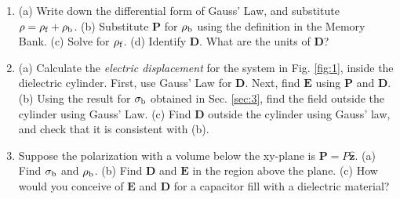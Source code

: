 \documentclass[10pt]{article}
\begin{document}
\begin{enumerate}
\item (a) Write down the differential form of Gauss' Law, and substitute $\rho = \rho_{\rm f} + \rho_{\rm b}$. (b) Substitute $\mathbf{P}$ for $\rho_{\rm b}$ using the definition in the Memory Bank. (c) Solve for $\rho_{\rm f}$. (d) Identify $\mathbf{D}$. What are the units of $\mathbf{D}$? \\ \vspace{1cm}
\item (a) Calculate the \textit{electric displacement} for the system in Fig. \ref{fig:1}, inside the dielectric cylinder.  First, use Gauss' Law for $\mathbf{D}$.  Next, find $\mathbf{E}$ using $\mathbf{P}$ and $\mathbf{D}$. (b) Using the result for $\sigma_{\rm b}$ obtained  in Sec. \ref{sec:3}, find the field outside the cylinder using Gauss' Law. (c) Find $\mathbf{D}$ outside the cylinder using Gauss' law, and check that it is consistent with (b). \\ \vspace{4cm}
\item Suppose the polarization with a volume below the xy-plane is $\mathbf{P}=P\hat{\mathbf{z}}$. (a) Find $\sigma_{\rm b}$ and $\rho_{\rm b}$.  (b) Find $\mathbf{D}$ and $\mathbf{E}$ in the region above the plane. (c) How would you conceive of $\mathbf{E}$ and $\mathbf{D}$ for a capacitor fill with a dielectric material?
\end{enumerate}
\end{document}
